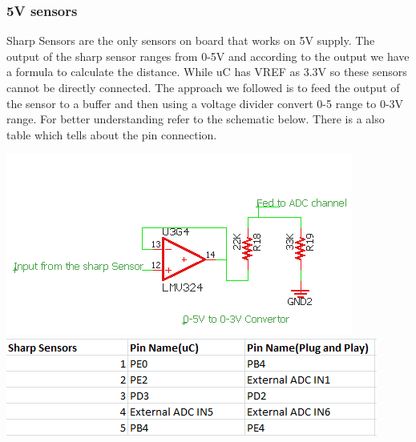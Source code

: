 \documentclass[a4paper,12pt,oneside]{article}
\begin{document}
{		\subsubsection{\Large \textbf{5V sensors}}
		{Sharp Sensors are the only sensors on board that works on 5V supply. The output of the sharp sensor ranges from 0-5V and according to the output we have a formula to calculate the distance. While uC has VREF as 3.3V so these sensors cannot be directly connected. The approach we followed is to feed the output of the sensor to a buffer and then using a voltage divider convert 0-5 range to 0-3V range. For better understanding refer to the schematic below. There is a  also table which tells about the pin connection.}
		\begin{center}
			\includegraphics{Images/5Vsensor1}\\
			\includegraphics{Images/5Vsensor2}\\
		\end{center}
}
\end{document}
